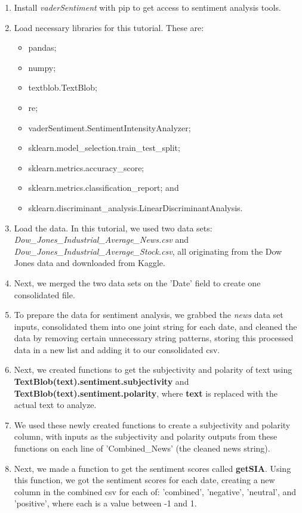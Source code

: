 \documentclass[10pt,twocolumn]{article}
\begin{document}
\begin{enumerate}
    \item Install \textit{vaderSentiment} with pip to get access to sentiment analysis tools.
    \item Load necessary libraries for this tutorial. These are:
    \begin{itemize}
        \item pandas;
        \item numpy;
        \item textblob.TextBlob;
        \item re;
        \item vaderSentiment.SentimentIntensityAnalyzer;
        \item sklearn.model\_selection.train\_test\_split;
        \item sklearn.metrics.accuracy\_score;
        \item sklearn.metrics.classification\_report; and
        \item sklearn.discriminant\_analysis.LinearDiscriminantAnalysis.
    \end{itemize}
    \item Load the data. In this tutorial, we used two data sets: \textit{Dow\_Jones\_Industrial\_Average\_News.csv} and \textit{Dow\_Jones\_Industrial\_Average\_Stock.csv}, all originating from the Dow Jones data and downloaded from Kaggle.
    \item Next, we merged the two data sets on the 'Date' field to create one consolidated file.
    \item To prepare the data for sentiment analysis, we grabbed the \textit{news} data set inputs, consolidated them into one joint string for each date, and cleaned the data by removing certain unnecessary string patterns, storing this processed data in a new list and adding it to our consolidated csv.
    \item Next, we created functions to get the subjectivity and polarity of text using \textbf{TextBlob(text).sentiment.subjectivity} and \textbf{TextBlob(text).sentiment.polarity}, where \textbf{text} is replaced with the actual text to analyze.
    \item We used these newly created functions to create a subjectivity and polarity column, with inputs as the subjectivity and polarity outputs from these functions on each line of 'Combined\_News' (the cleaned news string).
    \item Next, we made a function to get the sentiment scores called \textbf{getSIA}. Using this function, we got the sentiment scores for each date, creating a new column in the combined csv for each of: 'combined', 'negative', 'neutral', and 'positive', where each is a value between -1 and 1.

\end{enumerate}
\end{document}
